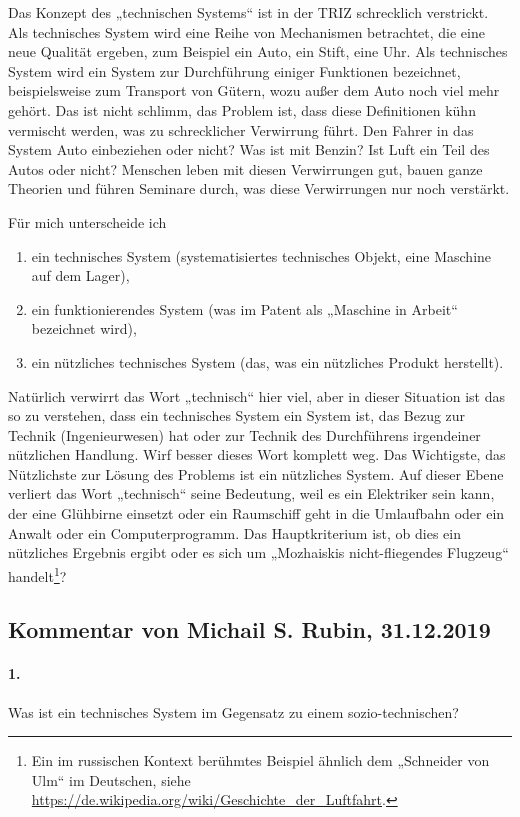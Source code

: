 \documentclass[11pt,a4paper]{article}
\begin{document}
Das Konzept des „technischen Systems“ ist in der TRIZ schrecklich verstrickt.
Als technisches System wird eine Reihe von Mechanismen betrachtet, die eine
neue Qualität ergeben, zum Beispiel ein Auto, ein Stift, eine Uhr. Als
technisches System wird ein System zur Durchführung einiger Funktionen
bezeichnet, beispielsweise zum Transport von Gütern, wozu außer dem Auto noch
viel mehr gehört. Das ist nicht schlimm, das Problem ist, dass diese
Definitionen kühn vermischt werden, was zu schrecklicher Verwirrung führt.
Den Fahrer in das System Auto einbeziehen oder nicht? Was ist mit Benzin? Ist
Luft ein Teil des Autos oder nicht? Menschen leben mit diesen Verwirrungen
gut, bauen ganze Theorien und führen Seminare durch, was diese Verwirrungen
nur noch verstärkt.

Für mich unterscheide ich
\begin{enumerate}
\item ein technisches System (systematisiertes technisches Objekt, eine
  Maschine auf dem Lager),
\item ein funktionierendes System (was im Patent als „Maschine in Arbeit“
  bezeichnet wird),
\item ein nützliches technisches System (das, was ein nützliches Produkt
  herstellt).
\end{enumerate}

Natürlich verwirrt das Wort „technisch“ hier viel, aber in dieser Situation
ist das so zu verstehen, dass ein technisches System ein System ist, das Bezug
zur Technik (Ingenieurwesen) hat oder zur Technik des Durchführens irgendeiner
nützlichen Handlung. Wirf besser dieses Wort komplett weg. Das Wichtigste, das
Nützlichste zur Lösung des Problems ist ein nützliches System. Auf dieser
Ebene verliert das Wort „technisch“ seine Bedeutung, weil es ein Elektriker
sein kann, der eine Glühbirne einsetzt oder ein Raumschiff geht in die
Umlaufbahn oder ein Anwalt oder ein Computerprogramm. Das Hauptkriterium ist,
ob dies ein nützliches Ergebnis ergibt oder es sich um „Mozhaiskis
nicht-fliegendes Flugzeug“ handelt\footnote{Ein im russischen Kontext
  berühmtes Beispiel ähnlich dem „Schneider von Ulm“ im Deutschen, siehe
  \url{https://de.wikipedia.org/wiki/Geschichte_der_Luftfahrt}.}?

\subsection{Kommentar von Michail S. Rubin, 31.12.2019}

\paragraph{1.}
Was ist ein technisches System im Gegensatz zu einem sozio-technischen?
\end{document}
